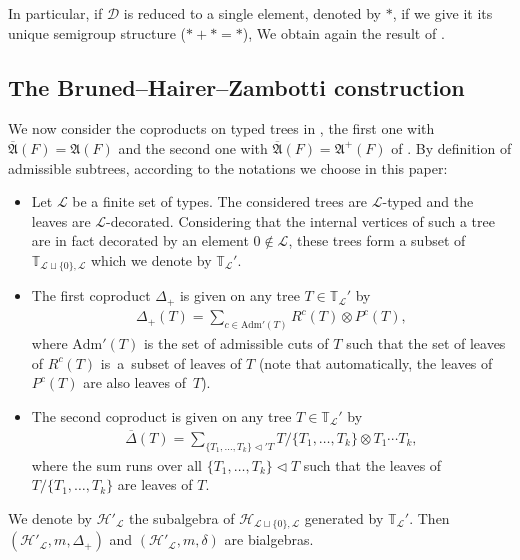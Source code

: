 \documentclass[10pt,a4paper]{amsart}
\numberwithin{equation}{section}
\renewcommand{\L}{\mathcal{L}}
\newcommand{\D}{\mathcal{D}}
\newcommand{\adm}{\mathrm{Adm}}
\newcommand{\h}{\mathcal{H}}
\newcommand{\bfT}{\mathbb{T}}
\begin{document}
In particular, if $\D$ is reduced to a single element, denoted by $*$,
if we give it its unique semigroup structure ($*+*=*$), We obtain again the result of \cite{Manchon}.

\subsection{The Bruned--Hairer--Zambotti construction}

We now consider the coproducts on typed trees in \cite[Theorem 2.2.16]{Bruned},
the first one with \mbox{$\overline{\mathfrak{A}}(F)=\mathfrak{A}(F)$} and the second one with
$\overline{\mathfrak{A}}(F)=\mathfrak{A}^+(F)$ of \cite[Definition 2.4.1]{Bruned}.
By definition \cite[Definition~2.26]{Bruned} of admissible subtrees, according to the notations we choose in this paper:
\begin{itemize}\itemsep=0pt
\item Let $\L$ be a finite set of types. The considered trees are $\L$-typed and the leaves are $\L$-decorated.
Considering that the internal vertices of such a tree are in fact decorated by an element $0\notin \L$,
these trees form a subset of $\bfT_{\L\sqcup\{0\},\L}$ which we denote by $\bfT_\L'$.
\item The first coproduct $\Delta_+$ is given on any tree $T\in \bfT_\L'$ by
\begin{gather*}
\Delta_+(T)=\sum_{c\in \adm'(T)} R^c(T)\otimes P^c(T),
\end{gather*}
where $\adm'(T)$ is the set of admissible cuts of $T$ such that the set of leaves of $R^c(T)$ is~a~subset of leaves of $T$
(note that automatically, the leaves of $P^c(T)$ are also leaves of~$T$).
\item The second coproduct is given on any tree $T\in \bfT_\L'$ by
\begin{gather*}
\overline{\Delta}(T)=\sum_{\{T_1,\dots,T_k\}\triangleleft' T}T/\{T_1,\dots,T_k\}\otimes T_1\cdots T_k,
\end{gather*}
where the sum runs over all $\{T_1,\dots,T_k\}\triangleleft T$ such that the leaves of $T/\{T_1,\dots,T_k\}$
are leaves of $T$.
\end{itemize}
We denote by $\h'_\L$ the subalgebra of $\h_{\L\sqcup\{0\}, \L}$ generated by $\bfT_\L'$.
Then $(\h'_\L,m,\Delta_+)$ and $(\h'_\L,m,\delta)$ are bialgebras.
\end{document}
